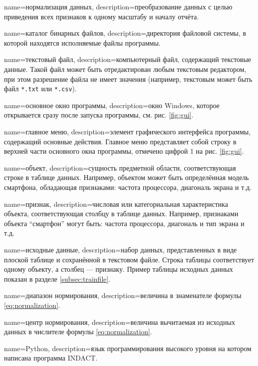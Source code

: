 {
	name=нормализация данных,
	description={преобразование данных с целью приведения всех признаков к одному масштабу и началу отчёта.}
}

{
	name=каталог бинарных файлов,
	description={директория файловой системы, в которой находятся исполняемые файлы программы.}
}

{
	name=текстовый файл,
	description={компьютерный файл, содержащий текстовые данные. Такой файл может быть отредактирован любым текстовым редактором, при этом разрешение файла не имеет значения (например, текстовым может быть файл \texttt{*.txt} или \texttt{*.csv}). }
}

{
	name=основное окно программы,
	description={окно Windows, которое открывается сразу после запуска программы, см. рис. \ref{fig:gui}.}
}

{
	name=главное меню,
	description={элемент графического интерфейса программы, содержащий основные действия. Главное меню представляет собой строку в верхней части основного окна программы, отмечено цифрой 1 на рис. \ref{fig:gui}.}
}

{
	name=объект,
	description={сущность предметной области, соответствующая строке в таблице данных. Например, объектом может быть определённая модель смартфона, обладающая признаками: частота процессора, диагональ экрана и т.д.}
}


{
	name=признак,
	description={числовая или категориальная характеристика объекта, соответствующая столбцу в таблице данных. Например, признаками объекта ``смартфон'' могут быть:  частота процессора, диагональ и тип экрана и т.д.}
}


{
	name=исходные данные,
	description={набор данных, представленных в виде плоской таблице и сохранённой в текстовом файле. Строка таблицы соответствует одному объекту, а столбец --- признаку. Пример таблицы исходных данных показан в разделе \ref{subsec:trainfile}.}
}

{
	name=диапазон нормирования,
	description={величина в знаменателе формулы \ref{eq:normalization}.}
}

{
	name=центр нормирования,
	description={величина вычитаемая из исходных данных в числителе формулы \ref{eq:normalization}.}
}

{
	name=Python,
	description={язык программирования высокого уровня на котором написана программа INDACT.}
}


